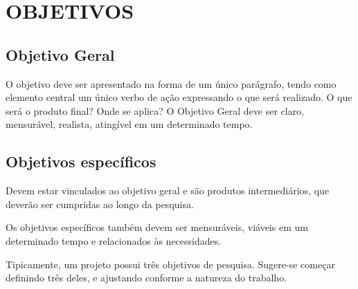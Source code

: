 \section{OBJETIVOS}

\subsection{Objetivo Geral}

O objetivo deve ser apresentado na forma de um único parágrafo, tendo como elemento central um único verbo de ação expressando o que será realizado. O que será o produto final? Onde se aplica? O Objetivo Geral deve ser claro, mensurável, realista, atingível em um determinado tempo.

\subsection{Objetivos específicos}

\begin{alineas}
    
    \item Devem estar vinculados ao objetivo geral e são produtos intermediários, que deverão ser cumpridas ao longo da pesquisa.
    \item Os objetivos específicos também devem ser mensuráveis, viáveis em um determinado tempo e relacionados às necessidades.
    \item Tipicamente, um projeto possui três objetivos de pesquisa. Sugere-se começar definindo três deles, e ajustando conforme a natureza do trabalho. 

\end{alineas}